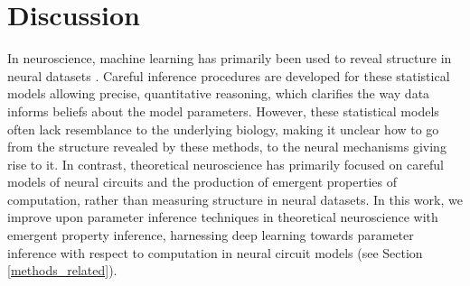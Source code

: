 \documentclass[11pt]{article}
\begin{document}
\section{Discussion} 
In neuroscience, machine learning has primarily been used to reveal structure in neural datasets \cite{paninski2018neural}.
Careful inference procedures are developed for these statistical models allowing precise, quantitative reasoning, which clarifies the way data informs beliefs about the model parameters.  
However, these statistical models often lack resemblance to the underlying biology, making it unclear how to go from the structure revealed by these methods, to the neural mechanisms giving rise to it. 
In contrast, theoretical neuroscience has primarily focused on careful models of neural circuits and the production of emergent properties of computation, rather than measuring structure in neural datasets.
In this work, we improve upon parameter inference techniques in theoretical neuroscience with emergent property inference, harnessing deep learning towards parameter inference with respect to computation in neural circuit models (see Section \ref{methods_related}).
\end{document}
